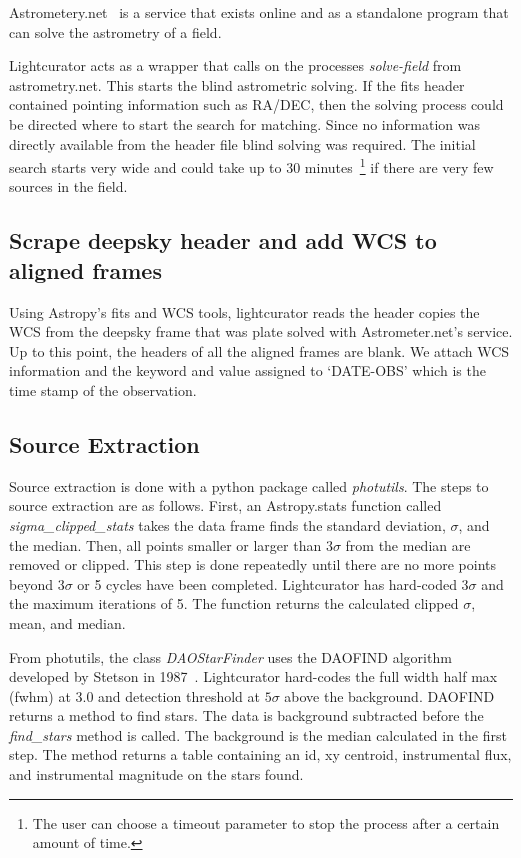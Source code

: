 Astrometery.net~\cite{lang_2010} is a service that exists online
and as a standalone program that can solve the astrometry of a field.

Lightcurator acts as a wrapper that calls on the processes 
\textit{solve-field} from astrometry.net.
This starts the blind astrometric solving.
If the fits header contained pointing information such as RA/DEC, then
the solving process could be directed where to start the search for matching.
Since no information was directly available from the header file blind solving
was required.
The initial search starts very wide and could take up to 30 
minutes~\footnote{The user can choose a timeout parameter to
stop the process after a certain amount of time.} if there are
very few sources in the field.

\subsection{Scrape deepsky header and add WCS to aligned frames}
Using Astropy's fits and WCS tools, lightcurator reads the header copies the 
WCS from the deepsky frame that was plate solved with Astrometer.net's service.
Up to this point, the headers of all the aligned frames are blank.
We attach WCS information and the keyword and value assigned to `DATE-OBS' which
is the time stamp of the observation.


\subsection{Source Extraction}
Source extraction is done with a python package called \textit{photutils}.
The steps to source extraction are as follows.
First, an Astropy.stats function called \textit{sigma\_clipped\_stats} takes
        the data frame finds the standard deviation, $\sigma$,
        and the median. Then, all points smaller or larger than $3 \sigma$
        from the median are removed or clipped.
        This step is done repeatedly 
        until there are no more points beyond $3 \sigma$ or 5 cycles have
        been completed. Lightcurator has hard-coded $3 \sigma$ and the 
        maximum iterations of 5. The function returns 
        the calculated clipped $\sigma$, mean, and median.

From photutils, the class \textit{DAOStarFinder}
uses the DAOFIND algorithm developed
by Stetson in 1987~\cite{stetson_1987}. 
Lightcurator hard-codes the full width half max (fwhm)
at 3.0 and detection threshold at $5 \sigma$ 
above the background.
DAOFIND returns a method to find stars. 
The data is background subtracted before the \textit{find\_stars} method
is called.
The background is the median calculated in the first step.
The method returns a table containing an id, xy centroid, instrumental
flux, and instrumental magnitude on the stars found.

